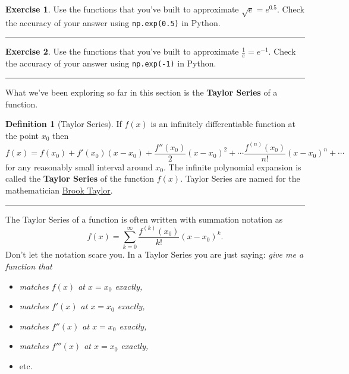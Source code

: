\documentclass[
]{book}
\providecommand{\tightlist}{%
  \setlength{\itemsep}{0pt}\setlength{\parskip}{0pt}}
\theoremstyle{definition}
\newtheorem{definition}{Definition}[chapter]
\theoremstyle{definition}
\theoremstyle{definition}
\newtheorem{exercise}{Exercise}[chapter]
\theoremstyle{remark}
\begin{document}
\begin{exercise}
\protect\hypertarget{exr:unnamed-chunk-35}{}{\label{exr:unnamed-chunk-35} }Use the functions that you've built to approximate \(\sqrt{e} = e^{0.5}\). Check the accuracy of your answer using \texttt{np.exp(0.5)} in Python.
\end{exercise}

\begin{center}\rule{0.5\linewidth}{0.5pt}\end{center}

\begin{exercise}
\protect\hypertarget{exr:unnamed-chunk-36}{}{\label{exr:unnamed-chunk-36} }Use the functions that you've built to approximate \(\frac{1}{e} = e^{-1}\). Check the accuracy of your answer using \texttt{np.exp(-1)} in Python.
\end{exercise}

\begin{center}\rule{0.5\linewidth}{0.5pt}\end{center}

What we've been exploring so far in this section is the \textbf{Taylor Series} of a function.

\begin{definition}[Taylor Series]
\protect\hypertarget{def:unnamed-chunk-37}{}{\label{def:unnamed-chunk-37} {} }If \(f(x)\) is an infinitely differentiable function at the point \(x_0\) then
\[ f(x) = f(x_0) + f'(x_0)(x-x_0) + \frac{f''(x_0)}{2}(x-x_0)^2 + \cdots \frac{f^{(n)}(x_0)}{n!}(x-x_0)^n + \cdots  \]
for any reasonably small interval around \(x_0\). The infinite polynomial expansion is called the \textbf{Taylor Series} of the function \(f(x)\). Taylor Series are named for the mathematician \href{https://en.wikipedia.org/wiki/Brook_Taylor}{Brook Taylor}.
\end{definition}

\begin{center}\rule{0.5\linewidth}{0.5pt}\end{center}

The Taylor Series of a function is often written with summation notation as
\[ f(x) = \sum_{k=0}^\infty \frac{f^{(k)}(x_0)}{k!} (x-x_0)^k. \]
Don't let the notation scare you. In a Taylor Series you are just saying: \emph{give me a function that}

\begin{itemize}
\tightlist
\item
  \emph{matches \(f(x)\) at \(x=x_0\) exactly,}
\item
  \emph{matches \(f'(x)\) at \(x=x_0\) exactly,}
\item
  \emph{matches \(f''(x)\) at \(x=x_0\) exactly,}
\item
  \emph{matches \(f'''(x)\) at \(x=x_0\) exactly,}
\item
  etc.
\end{itemize}
\end{document}
